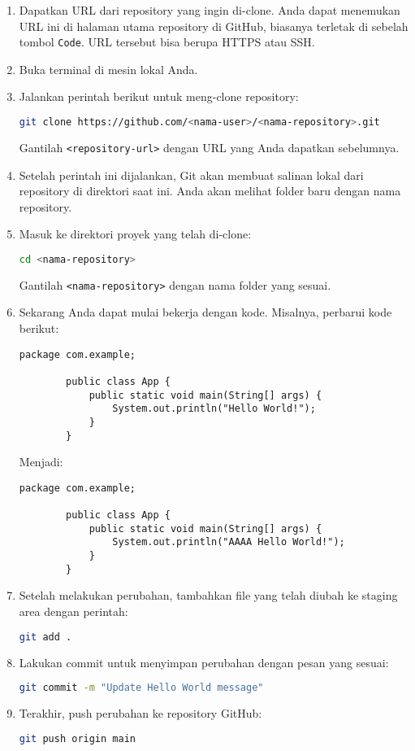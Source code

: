 \begin{enumerate}
	\item Dapatkan URL dari repository yang ingin di-clone. Anda dapat menemukan URL ini di halaman utama repository di GitHub, biasanya terletak di sebelah tombol \texttt{Code}. URL tersebut bisa berupa HTTPS atau SSH.
	
	\item Buka terminal di mesin lokal Anda.
	
	\item Jalankan perintah berikut untuk meng-clone repository:
	\begin{lstlisting}[language=bash]
		git clone https://github.com/<nama-user>/<nama-repository>.git
	\end{lstlisting}
	Gantilah \texttt{<repository-url>} dengan URL yang Anda dapatkan sebelumnya.
	
	\item Setelah perintah ini dijalankan, Git akan membuat salinan lokal dari repository di direktori saat ini. Anda akan melihat folder baru dengan nama repository.
	
	\item Masuk ke direktori proyek yang telah di-clone:
	\begin{lstlisting}[language=bash]
		cd <nama-repository>
	\end{lstlisting}
	Gantilah \texttt{<nama-repository>} dengan nama folder yang sesuai.
	
	\item Sekarang Anda dapat mulai bekerja dengan kode. Misalnya, perbarui kode berikut:
	\begin{lstlisting}[style=java]
		package com.example;
		
		public class App {
			public static void main(String[] args) {
				System.out.println("Hello World!");
			}
		}
	\end{lstlisting}
	Menjadi:
	\begin{lstlisting}[style=java]
		package com.example;
		
		public class App {
			public static void main(String[] args) {
				System.out.println("AAAA Hello World!");
			}
		}
	\end{lstlisting}
	
	\item Setelah melakukan perubahan, tambahkan file yang telah diubah ke staging area dengan perintah:
	\begin{lstlisting}[language=bash]
		git add .
	\end{lstlisting}
	
	\item Lakukan commit untuk menyimpan perubahan dengan pesan yang sesuai:
	\begin{lstlisting}[language=bash]
		git commit -m "Update Hello World message"
	\end{lstlisting}
	
	\item Terakhir, push perubahan ke repository GitHub:
	\begin{lstlisting}[language=bash]
		git push origin main
	\end{lstlisting}
\end{enumerate}

